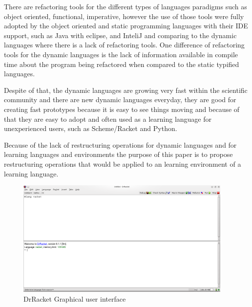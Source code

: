 There are refactoring tools for the different types of languages paradigms such as object oriented, functional, imperative, however the use of those tools were fully adopted by the object oriented and static programming languages with their IDE support, such as Java with eclipse, and InteliJ and %
comparing to the dynamic languages where there is a lack of refactoring tools. 
One difference of refactoring tools for the dynamic languages is the lack of information available in compile time about the program being refactored when compared to the static typified languages.

Despite of that, the dynamic languages are growing very fast within the scientific community and there are new dynamic languages everyday, they are good for creating fast prototypes because it is easy to see things moving and because of that they are easy to adopt and often used as a learning language for unexperienced users, such as Scheme/Racket and Python. %


Because of the lack of restructuring operations for dynamic languages and for learning languages and environments the purpose of this paper is to propose restructuring operations that would be applied to an learning environment of a learning language. %


\begin{figure}[htbp]
	\centering
	\includegraphics[width=0.95\textwidth]{img/DrRacketGui.png}
	\caption{DrRacket Graphical user interface}
	\label{fig:DrRacketGui}
\end{figure}

